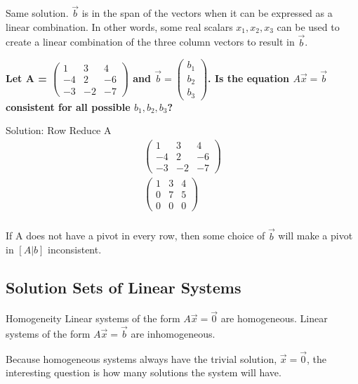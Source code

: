 \noindent
Same solution. \(\Vec{b}\) is in the span of the vectors when it can be expressed as a linear combination. In other words, some real scalars \(x_1, x_2, x_3\) can be used to create a linear combination of the three column vectors to result in \(\Vec{b}\).

\noindent
\newline
\textbf{Let A = \(\begin{pmatrix}
    1 & 3 & 4 \\
    -4 & 2 & -6 \\
    -3 & -2 & -7
    \end{pmatrix}\) and \(\Vec{b} = \begin{pmatrix}
        b_1 \\ b_2 \\ b_3
    \end{pmatrix}\). Is the equation \(A\Vec{x} = \Vec{b}\) consistent for all possible \(b_1, b_2, b_3\)?}

\noindent
Solution: Row Reduce A
\begin{align}
    \begin{pmatrix}
    1 & 3 & 4 \\
    -4 & 2 & -6 \\
    -3 & -2 & -7
    \end{pmatrix} \\
    \begin{pmatrix}
        1 & 3 & 4 \\
        0 & 7 & 5 \\
        0 & 0 & 0
    \end{pmatrix} \\
\end{align}

\noindent
If A does not have a pivot in every row, then some choice of \(\Vec{b}\) will make a pivot in \([A|b]\) inconsistent.

\subsection{Solution Sets of Linear Systems}
\begin{definition}
    Homogeneity
    Linear systems of the form \(A\Vec{x} = \Vec{0}\) are homogeneous.
    Linear systems of the form \(A\Vec{x} = \Vec{b}\) are inhomogeneous.
\end{definition}

\noindent
Because homogeneous systems always have the trivial solution, \(\Vec{x} = \Vec{0}\), the interesting question is how many solutions the system will have.

